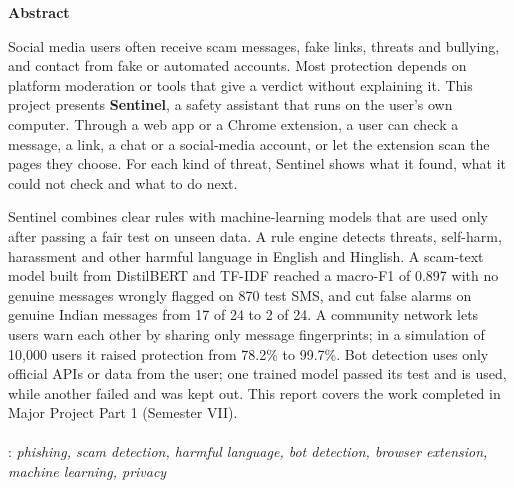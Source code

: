 \newpage
\thispagestyle{plain}
\begin{center}
\textbf {{\Large Abstract}} \\
\vspace{2pc}
\end{center}
\onehalfspacing
\noindent Social media users often receive scam messages, fake links, threats and bullying, and contact from fake or automated accounts. Most protection depends on platform moderation or tools that give a verdict without explaining it. This project presents \textbf{Sentinel}, a safety assistant that runs on the user's own computer. Through a web app or a Chrome extension, a user can check a message, a link, a chat or a social-media account, or let the extension scan the pages they choose. For each kind of threat, Sentinel shows what it found, what it could not check and what to do next.

\vspace{0.5pc}
\noindent Sentinel combines clear rules with machine-learning models that are used only after passing a fair test on unseen data. A rule engine detects threats, self-harm, harassment and other harmful language in English and Hinglish. A scam-text model built from DistilBERT and TF-IDF reached a macro-F1 of 0.897 with no genuine messages wrongly flagged on 870 test SMS, and cut false alarms on genuine Indian messages from 17 of 24 to 2 of 24. A community network lets users warn each other by sharing only message fingerprints; in a simulation of 10,000 users it raised protection from 78.2\% to 99.7\%. Bot detection uses only official APIs or data from the user; one trained model passed its test and is used, while another failed and was kept out. This report covers the work completed in Major Project Part 1 (Semester VII).
\\
\\
: {\it phishing, scam detection, harmful language, bot detection, browser extension, machine learning, privacy}
